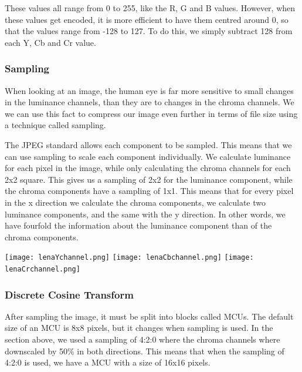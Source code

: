 \begin{infobox}
These values all range from 0 to 255, like the R, G and B values. 
However, when these values get encoded, it is more efficient to have them centred around 0, so that the values range from -128 to 127.
To do this, we simply subtract 128 from each Y, Cb and Cr value.

\vspace{4mm}
\subsubsection{Sampling}
\vspace{-2.5mm}
When looking at an image, the human eye is far more sensitive to small changes in the luminance channels, than they are to changes in the chroma channels. We we can use this fact to compress our image even further in terms of file size using a technique called sampling. 

The JPEG standard allows each component to be sampled.
This means that we can use sampling to scale each component individually. 
We calculate luminance for each pixel in the image, while only calculating the chroma channels for each 2x2 square.
This gives us a sampling of 2x2 for the luminance component, while the chroma components have a sampling of 1x1.
This means that for every pixel in the x direction we calculate the chroma components, we calculate two luminance components, and the same with the y direction.
In other words, we have fourfold the information about the luminance component than of the chroma components.

\begin{centering}
\texttt{[image: lenaYchannel.png]}
\texttt{[image: lenaCbchannel.png]}
\texttt{[image: lenaCrchannel.png]}
\label{fig:YCbCrChannels}
\end{centering}

\vspace{4mm}
\subsubsection{Discrete Cosine Transform}
\vspace{-2.5mm}
After sampling the image, it must be split into blocks called MCUs. The default size of an MCU is 8x8 pixels, but it changes when sampling is used. In the section above, we used a sampling of 4:2:0 where the chroma channels where downscaled by 50\% in both directions. This means that when the sampling of 4:2:0 is used, we have a MCU with a size of 16x16 pixels.


\end{infobox}
